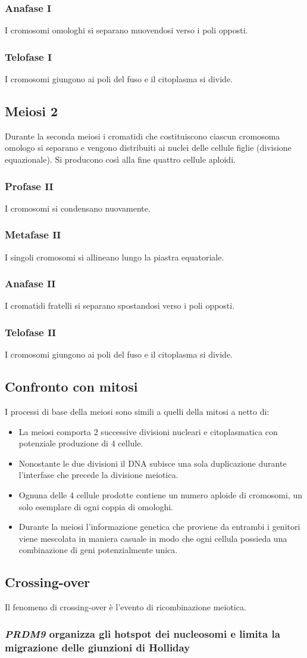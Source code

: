 \subsubsection{Anafase $\mathbf{I}$}
I cromosomi omologhi si separano muovendosi verso i poli opposti. 
\subsubsection{Telofase $\mathbf{I}$}
I cromosomi giungono ai poli del fuso e il citoplasma si divide.
\subsection{Meiosi $\mathbf{2}$}
Durante la seconda meiosi i cromatidi che costituiscono ciascun cromosoma omologo si separano e vengono distribuiti ai nuclei delle cellule figlie (divisione equazionale). Si producono
cos\`i alla fine quattro cellule aploidi. 
\subsubsection{Profase $\mathbf{II}$}
I cromosomi si condensano nuovamente. 
\subsubsection{Metafase $\mathbf{II}$}
I singoli cromosomi si allineano lungo la piastra equatoriale. 
\subsubsection{Anafase $\mathbf{II}$}
I cromatidi fratelli si separano spostandosi verso i poli opposti. 
\subsubsection{Telofase $\mathbf{II}$}
I cromosomi giungono ai poli del fuso e il citoplasma si divide. 
\subsection{Confronto con mitosi}
I processi di base della meiosi sono simili a quelli della mitosi a netto di:
\begin{itemize}
	\item La meiosi comporta $2$ successive divisioni nucleari e citoplasmatica con potenziale produzione di $4$ cellule. 
	\item Nonostante le due divisioni il DNA subisce una sola duplicazione durante l'interfase che precede la divisione meiotica. 
	\item Ognuna delle $4$ cellule prodotte contiene un numero aploide di cromosomi, un solo esemplare di ogni coppia di omologhi. 
	\item Durante la meiosi l'informazione genetica che proviene da entrambi i genitori viene mescolata in maniera casuale in modo che ogni cellula possieda una combinazione di geni
		potenzialmente unica. 
\end{itemize}
\subsection{Crossing-over}
Il fenomeno di crossing-over \`e l'evento di ricombinazione meiotica.
\subsubsection{\emph{PRDM9} organizza gli hotspot dei nucleosomi e limita la migrazione delle giunzioni di Holliday}

